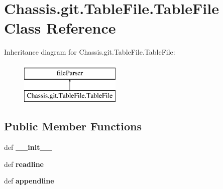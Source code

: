 \hypertarget{class_chassis_8git_1_1_table_file_1_1_table_file}{\section{Chassis.\-git.\-Table\-File.\-Table\-File Class Reference}
\label{class_chassis_8git_1_1_table_file_1_1_table_file}
}
Inheritance diagram for Chassis.\-git.\-Table\-File.\-Table\-File\-:\begin{figure}[H]
\begin{center}
\leavevmode
\includegraphics[height=2.000000cm]{class_chassis_8git_1_1_table_file_1_1_table_file}
\end{center}
\end{figure}
\subsection*{Public Member Functions}
\begin{DoxyCompactItemize}
\item 
\hypertarget{class_chassis_8git_1_1_table_file_1_1_table_file_a5f5dad4b053f568906463add0f88d098}{def {\bfseries \-\_\-\-\_\-init\-\_\-\-\_\-}}\label{class_chassis_8git_1_1_table_file_1_1_table_file_a5f5dad4b053f568906463add0f88d098}

\item 
\hypertarget{class_chassis_8git_1_1_table_file_1_1_table_file_a6b894ba9012b5d7430edca1d1bc98ce6}{def {\bfseries readline}}\label{class_chassis_8git_1_1_table_file_1_1_table_file_a6b894ba9012b5d7430edca1d1bc98ce6}

\item 
\hypertarget{class_chassis_8git_1_1_table_file_1_1_table_file_a35b4fa60a30f98af6941411d3ba16bc0}{def {\bfseries appendline}}\label{class_chassis_8git_1_1_table_file_1_1_table_file_a35b4fa60a30f98af6941411d3ba16bc0}

\end{DoxyCompactItemize}
